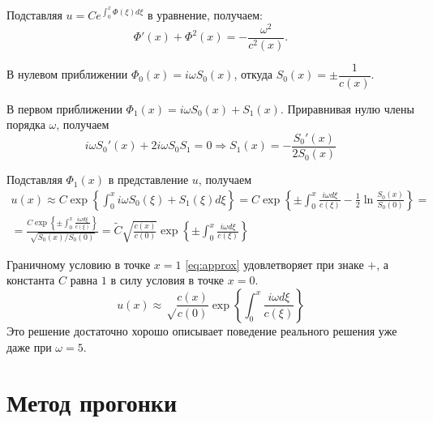 \documentclass[12pt]{article}
\begin{document}
Подставляя $u = C e^{\int_0^x \Phi(\xi) d\xi}$ в уравнение, получаем:
\[
\Phi'(x) + \Phi^2(x) = -\frac{\omega^2}{c^2(x)}.
\]

В нулевом приближении $\Phi_0(x) = i\omega S_0(x)$, откуда $S_0(x) =
\pm\dfrac{1}{c(x)}$.

В первом приближении $\Phi_1(x) = i\omega S_0(x) + S_1(x)$. Приравнивая
нулю члены порядка $\omega$, получаем
\[
i\omega S_0'(x) + 2 i \omega S_0 S_1 = 0 \Rightarrow S_1(x) =
-\frac{S_0'(x)}{2S_0(x)}
\]

Подставляя $\Phi_1(x)$ в представление $u$, получаем
\begin{multline}
u(x) \approx 
C \exp{\left\{
\int_0^x i\omega S_0(\xi) + S_1(\xi) d\xi
\right\}}
= C \exp \left\{ \pm\int_0^x \frac{i\omega d\xi}{c(\xi)} -\frac{1}{2} \ln
\frac{S_0(x)}{S_0(0)} \right\} = \\
= \frac{C \exp{\left\{
	\pm\int_0^x \frac{i\omega d\xi} {c(\xi)}
	\right\}}}{\sqrt{S_0(x)/S_0(0)}} =
\tilde C \sqrt{\frac{c(x)}{c(0)}} \exp{\left\{\pm \int_0^x \frac{i\omega d\xi}{c(\xi)} \right\}}
\label{eq:approx}
\end{multline}

Граничному условию в точке $x=1$ \eqref{eq:approx} удовлетворяет при знаке $+$,
а константа $C$ равна $1$ в силу условия в точке $x = 0$.
\[
u(x) \approx \sqrt\frac{c(x)}{c(0)} \exp\left\{\int_0^x \frac{i\omega
d\xi}{c(\xi)}\right\}
\]
Это решение достаточно хорошо описывает поведение реального решения уже даже при
$\omega = 5$.
\section{Метод прогонки}
\end{document}
